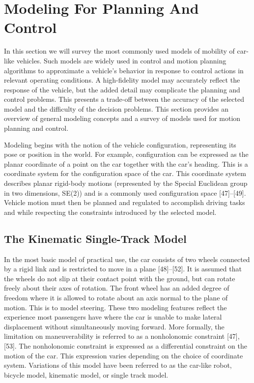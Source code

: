 \section{Modeling For Planning And Control}
In this section we will survey the most commonly used models of mobility of car-like vehicles. Such models are widely used in control and motion planning algorithms to approximate a vehicle’s behavior in response to control actions in relevant operating conditions. A high-fidelity model may accurately reflect the response of the vehicle, but the added detail may complicate the planning and control problems. This presents a trade-off between the accuracy of the selected model and the difficulty of the decision problems. This section provides an overview of general modeling concepts and a survey of models used for motion planning and control.

Modeling begins with the notion of the vehicle configuration, representing its pose or position in the world. For example, configuration can be expressed as the planar coordinate of a point on the car together with the car’s heading. This is a coordinate system for the configuration space of the car. This coordinate system describes planar rigid-body motions (represented by the Special Euclidean group in two dimensions, SE(2)) and is a commonly used configuration space [47]–[49]. Vehicle motion must then be planned and regulated to accomplish driving tasks and while respecting the constraints introduced by the selected model.

\subsection{The Kinematic Single-Track Model}
In the most basic model of practical use, the car consists of two wheels connected by a rigid link and is restricted to move in a plane [48]–[52]. It is assumed that the wheels do not slip at their contact point with the ground, but can rotate freely about their axes of rotation. The front wheel has an added degree of freedom where it is allowed to rotate about an axis normal to the plane of motion. This is to model steering. These two modeling features reflect the experience most passengers have where the car is unable to make lateral displacement without simultaneously moving forward. More formally, the limitation on maneuverability is referred to as a nonholonomic constraint [47], [53]. The nonholonomic constraint is expressed as a differential constraint on the motion of the car. This expression varies depending on the choice of coordinate system. Variations of this model have been referred to as the car-like robot, bicycle model, kinematic model, or single track model.

